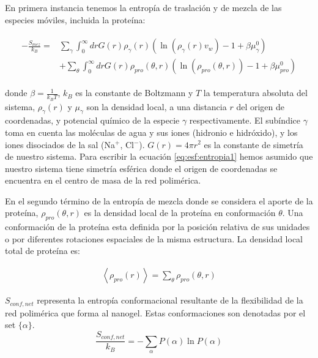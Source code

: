 En primera instancia tenemos la entrop\'ia de traslaci\'on y de mezcla de las especies m\'oviles, incluida la prote\'ina:


\begin{align}
	\begin{aligned}
		-\frac{S_{mez}}{k_B}= &\sum_{\gamma}\int_0^\infty{dr G(r)\rho_\gamma(r)\left(\ln \left(\rho_\gamma (r)v_w\right) -1 + \beta\mu^0_\gamma\right)} \\
		&+ \sum_{\theta}\int_0^\infty{dr G(r)\rho_{pro}(\theta,r)\left(\ln \left(\rho_{pro}(\theta,r)\right) -1 + \beta\mu^0_{pro} \right)}
	\end{aligned}
	\label{eq:esf:entropia1}
\end{align}



\noindent donde $\beta = \frac{1}{k_BT}$, $k_B$ es la constante de Boltzmann y $T$ la temperatura absoluta del sistema, $\rho_\gamma(r)$ y $\mu_\gamma$ son la densidad local, a una distancia $r$ del origen de coordenadas, y potencial qu\'imico de la especie $\gamma$ respectivamente.
El sub\'indice $\gamma$ toma en cuenta las mol\'eculas de agua y sus iones (hidronio e hidr\'oxido), y los iones disociados de la sal (Na$^+$, Cl$^-$). $G(r) =4\pi r^2$ es la constante de simetr\'ia de nuestro sistema. Para escribir la ecuaci\'on \ref{eq:esf:entropia1} hemos asumido que nuestro sistema tiene simetr\'ia esf\'erica donde el origen de coordenadas se encuentra en el centro de masa de la red polim\'erica.

En el segundo t\'ermino de la entrop\'ia de mezcla donde se considera el aporte de la prote\'ina,
$\rho_{pro}(\theta,r)$ es la densidad local de la prote\'ina en conformaci\'on  $\theta$.  Una conformaci\'on de la prote\'ina esta definida por la posici\'on relativa de sus unidades o por diferentes rotaciones espaciales de la misma estructura.
La densidad  local total de prote\'ina es: 


\begin{align}
	\left<\rho_{pro}(r)\right> = \sum_\theta{\rho_{pro}(\theta,r)}
\end{align}




$S_{conf,net}$ representa la entrop\'ia conformacional resultante de la flexibilidad de la red polim\'erica que forma al nanogel. Estas conformaciones son  denotadas por el set $\{\alpha\}$. 
\begin{equation}
	\frac{S_{conf,net}}{k_B} = - \sum_{\alpha}{P(\alpha)\ln P(\alpha)}
\end{equation}


